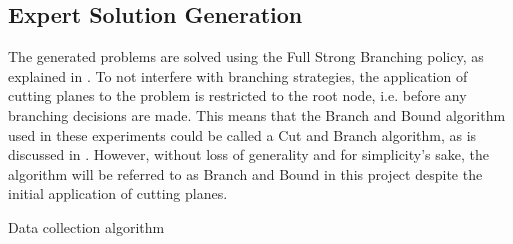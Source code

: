 







\subsection{Expert Solution Generation}\label{ssec:expertsolutiongeneration}

The generated problems are solved using the Full Strong Branching policy, as explained in . To not interfere with branching strategies, the application of cutting planes to the problem is restricted to the root node, i.e. before any branching decisions are made. This means that the Branch and Bound algorithm used in these experiments could be called a Cut and Branch algorithm, as is discussed in .
However, without loss of generality and for simplicity's sake, the algorithm will be referred to as Branch and Bound in this project despite the initial application of cutting planes.  


\begin{algorithm}[H]
    \SetAlgoLined
    
    \caption{\label{alg:datacol} Data collection algorithm}
\end{algorithm}


